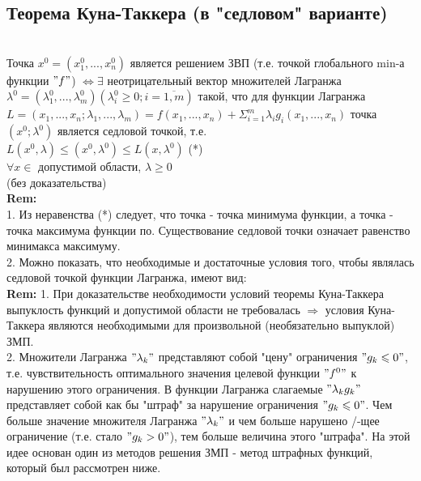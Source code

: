 \documentclass[a4paper]{article}
\begin{document}
\subsection*{Теорема Куна-Таккера (в "седловом" варианте)} \\
Точка $x^0 = (x_1^0, ..., x_n^0)$ является решением ЗВП (т.е. точкой глобального min-а функции $"f"$) $\Leftrightarrow \exists$ неотрицательный вектор множителей Лагранжа \\
$\lambda^0 = (\lambda_1^0, ... , \lambda_m^0) (\lambda_i^0 \geqslant 0; i = \overline{1, m})$ такой, что для функции Лагранжа \\
$L = (x_1, ..., x_n; \lambda_1, ..., \lambda_m) = f(x_1, ... , x_n) + \Sigma_{i = 1}^m \lambda_i g_i (x_1, ... , x_n)$ точка $(x^0; \lambda^0)$ является седловой точкой, т.е. \\
$L(x^0, \lambda) \leqslant (x^0, \lambda^0) \leqslant L(x, \lambda^0)$ (*) \\
$\forall x \in$ допустимой области, $\lambda \geqslant 0$ \\
(без доказательства) \\

\textbf{Rem:} \\
1. Из неравенства (*) следует, что точка - точка минимума функции, а точка - точка максимума функции по. Существование седловой точки означает равенство минимакса максимуму. \\
2. Можно показать, что необходимые и достаточные условия того, чтобы являлась седловой точкой функции Лагранжа, имеют вид: \\

\textbf{Rem: }
1. При доказательстве необходимости условий теоремы Куна-Таккера выпуклость функций и допустимой области не требовалась $\Rightarrow$ условия Куна-Таккера являются необходимыми для произвольной (необязательно выпуклой) ЗМП. \\
2. Множители Лагранжа $"\lambda_k"$ представляют собой "цену" ограничения $"g_k \leqslant 0"$, т.е. чувствительность оптимального значения целевой функции $"f^0"$ к нарушению этого ограничения. В функции Лагранжа слагаемые $"\lambda_k g_k"$ представляет собой как бы "штраф" за нарушение ограничения $"g_k \leqslant 0"$. Чем больше значение множителя Лагранжа $"\lambda_k"$ и чем больше нарушено /-щее ограничение (т.е. стало $"g_k > 0"$), тем больше величина этого "штрафа". На этой идее основан один из методов решения ЗМП - метод штрафных функций, который был рассмотрен ниже. \\
\end{document}
